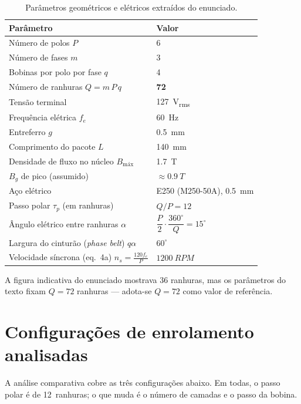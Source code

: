 \documentclass[12pt,a4paper]{article}
\begin{document}
\begin{table}[h]
\centering
\caption{Parâmetros geométricos e elétricos extraídos do enunciado.}
\renewcommand{\arraystretch}{1.1}
\begin{tabular}{ll}
\toprule
\textbf{Parâmetro} & \textbf{Valor} \\
\midrule
Número de polos $P$              & 6 \\
Número de fases $m$              & 3 \\
Bobinas por polo por fase $q$    & 4 \\
Número de ranhuras $Q = m\,P\,q$ & \textbf{72} \\
Tensão terminal                  & \SI{127}{V_{rms}} \\
Frequência elétrica $f_e$        & \SI{60}{Hz} \\
Entreferro $g$                   & \SI{0.5}{mm} \\
Comprimento do pacote $L$        & \SI{140}{mm} \\
Densidade de fluxo no núcleo $B_{\text{máx}}$ & \SI{1.7}{T} \\
$B_g$ de pico (assumido)         & $\approx \SI{0.9}{T}$ \\
Aço elétrico                     & E250 (M250-50A), \SI{0.5}{mm} \\
\midrule
Passo polar $\tau_p$ (em ranhuras)        & $Q/P = 12$ \\
Ângulo elétrico entre ranhuras $\alpha$   & $\dfrac{P}{2}\cdot\dfrac{360^{\circ}}{Q} = 15^{\circ}$ \\
Largura do cinturão (\emph{phase belt}) $q\alpha$ & $60^{\circ}$ \\
Velocidade síncrona (eq.~4a) $n_s = \tfrac{120 f_e}{P}$ & $\SI{1200}{RPM}$ \\
\bottomrule
\end{tabular}
\end{table}

\noindent A figura indicativa do enunciado mostrava 36 ranhuras, mas os parâmetros do texto fixam $Q=72$ ranhuras --- adota-se $Q=72$ como valor de referência.

\section{Configurações de enrolamento analisadas}

A análise comparativa cobre as três configurações abaixo. Em todas, o passo polar é de \mbox{12 ranhuras}; o que muda é o número de camadas e o passo da bobina.
\end{document}
